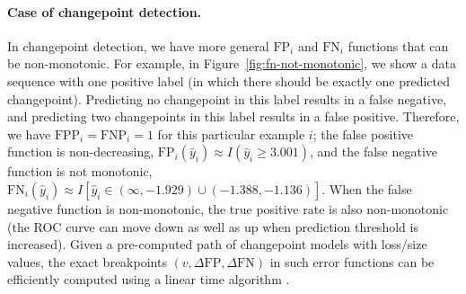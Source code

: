 \documentclass{article}
\begin{document}
\paragraph{Case of changepoint detection.} 
In changepoint detection, we have more general $\text{FP}_i$ and $\text{FN}_i$ functions that can be non-monotonic.
For example, in Figure~\ref{fig:fn-not-monotonic}, we show a data sequence with one positive label (in which there should be exactly one predicted changepoint).
Predicting no changepoint in this label results in a false negative, and predicting two changepoints in this label results in a false positive. 
Therefore, we have $\text{FPP}_i=\text{FNP}_i=1$ for this particular example $i$;
the false positive function is non-decreasing, $\text{FP}_i(\hat y_i) \approx I(\hat y_i \geq 3.001)$, and the false negative function is not monotonic, $\text{FN}_i(\hat y_i) \approx I[\hat y_i \in (\infty, -1.929)\cup (-1.388, -1.136)]$.
When the false negative function is non-monotonic, the true positive rate is also non-monotonic (the ROC curve can move down as well as up when prediction threshold is increased).
Given a pre-computed path of changepoint models with loss/size values, the exact breakpoints $(v,\Delta\text{FP},\Delta\text{FN})$ in such error functions can be efficiently computed using a linear time algorithm \citep{Vargovich2020arxiv}.
\end{document}
